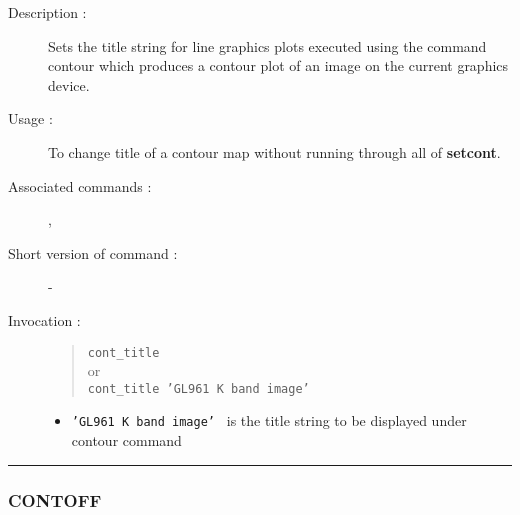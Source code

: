 \begin{description}

\item[Description :] Sets the title string for line graphics plots
executed using the command contour which produces a contour plot of an
image on the current graphics device.

\item[Usage :] To change title of a contour map without running through
all of {\bf setcont}.
\item[Associated commands :] {\tt {}}, 
{\tt {}}
\item[Short version of command :] -
\item[Invocation :]

\begin{quote}{\tt  cont\_title }\\
or \\
{\tt cont\_title 'GL961 K band image' }
\end{quote}

\begin{itemize}

\item {\tt 'GL961 K band image' } is the title string to be displayed
under contour command
\end{itemize}

\end{description}

\hrule 
\subsubsection*{\label{CONTOFF}CONTOFF}

